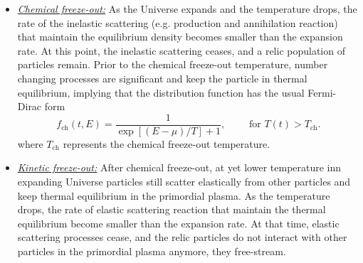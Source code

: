 \begin{itemize}
\item \underline{\it Chemical freeze-out:\/} 
As the Universe expands and the temperature drops, the rate of the inelastic scattering (e.g. production and annihilation reaction) that maintain the equilibrium density becomes smaller than the expansion rate. At this point, the inelastic scattering ceases, and a relic population of particles remain. Prior to the chemical freeze-out temperature, number changing processes are significant and keep the particle in thermal equilibrium, implying that the distribution function has the usual Fermi-Dirac form 
\begin{equation}\label{equilibrium}
f_\mathrm{ch}(t,E)=\frac{1}{\exp[(E-\mu)/T]+1},\qquad \text{ for } T(t)> T_\mathrm{ch}.
\end{equation}
where $T_\mathrm{ch}$ represents the chemical freeze-out temperature. 
%
\item \underline{\it Kinetic freeze-out:\/}
After chemical freeze-out, at yet lower temperature inn expanding Universe particles still scatter elastically from other particles and keep thermal equilibrium in the primordial plasma. As the temperature drops, the rate of elastic scattering reaction that maintain the thermal equilibrium become smaller than the expansion rate. At that time, elastic scattering processes cease, and the relic particles do not interact with other particles in the primordial plasma anymore, they free-stream. 


\end{itemize}
